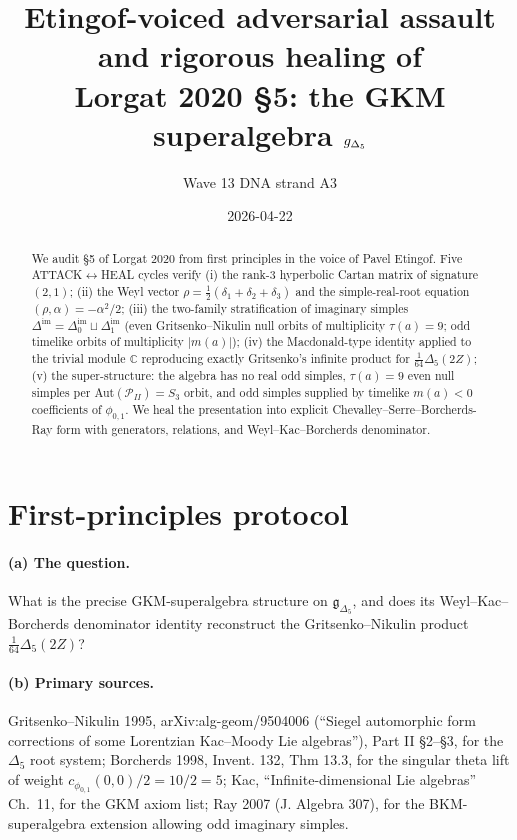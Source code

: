 \documentclass[11pt]{article}
\title{Etingof-voiced adversarial assault and rigorous healing of\\
       Lorgat 2020 \S 5: the GKM superalgebra $\g_{\Deltafive}$}
\author{Wave 13 DNA strand A3}
\date{2026-04-22}
\theoremstyle{definition}
\providecommand{\C}{\mathbb{C}}
\providecommand{\g}{\mathfrak{g}}
\providecommand{\PII}{\mathcal{P}_{I\!I}}
\providecommand{\dim}{\Delta^{\mathrm{im}}}
\providecommand{\Deltafive}{\Delta_5}
\providecommand{\phionezero}{\phi_{0,1}}
\begin{document}
\maketitle

\begin{abstract}
We audit \S 5 of Lorgat 2020 from first principles in the voice of Pavel
Etingof. Five ATTACK$\leftrightarrow$HEAL cycles verify (i) the rank-$3$
hyperbolic Cartan matrix of signature $(2,1)$; (ii) the Weyl vector
$\rho=\tfrac12(\delta_1+\delta_2+\delta_3)$ and the simple-real-root
equation $(\rho,\alpha)=-\alpha^2/2$; (iii) the two-family stratification
of imaginary simples $\dim=\dim_0\sqcup\dim_1$ (even Gritsenko--Nikulin
null orbits of multiplicity $\tau(a)=9$; odd timelike orbits of
multiplicity $|m(a)|$); (iv) the Macdonald-type identity applied to the
trivial module $\C$ reproducing exactly Gritsenko's infinite product for
$\tfrac{1}{64}\Deltafive(2Z)$; (v) the super-structure: the algebra has
no real odd simples, $\tau(a)=9$ even null simples per Aut$(\PII)=S_3$
orbit, and odd simples supplied by timelike $m(a)<0$ coefficients of
$\phionezero$. We heal the presentation into explicit
Chevalley--Serre--Borcherds-Ray form with generators, relations, and
Weyl--Kac--Borcherds denominator.
\end{abstract}

\section*{First-principles protocol}

\paragraph{(a) The question.} What is the precise GKM-superalgebra
structure on $\g_{\Deltafive}$, and does its Weyl--Kac--Borcherds
denominator identity reconstruct the Gritsenko--Nikulin product
$\tfrac{1}{64}\Deltafive(2Z)$?

\paragraph{(b) Primary sources.}
Gritsenko--Nikulin 1995, arXiv:alg-geom/9504006 (``Siegel automorphic
form corrections of some Lorentzian Kac--Moody Lie algebras''), Part II
\S 2--\S 3, for the $\Deltafive$ root system; Borcherds 1998, Invent.
132, Thm 13.3, for the singular theta lift of weight
$c_{\phionezero}(0,0)/2=10/2=5$; Kac, ``Infinite-dimensional Lie
algebras'' Ch.~11, for the GKM axiom list; Ray 2007 (J. Algebra 307),
for the BKM-superalgebra extension allowing odd imaginary simples.
\end{document}
